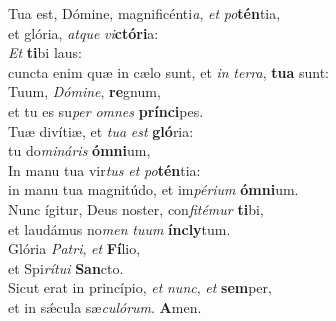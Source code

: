 \evenverse Tua est, Dómine, magnificénti\textit{a}, \textit{et} \textit{po}\textbf{tén}tia,~\*\\
\evenverse et glória, \textit{at}\textit{que} \textit{vi}\textbf{ctó}\textbf{ri}a:\\
\oddverse \textit{Et} \textbf{ti}bi laus:~\*\\
\oddverse cuncta enim quæ in cælo sunt, et \textit{in} \textit{ter}\textit{ra}, \textbf{tu}\textbf{a} sunt:\\
\evenverse Tuum, \textit{Dó}\textit{mi}\textit{ne}, \textbf{re}gnum,~\*\\
\evenverse et tu es su\textit{per} \textit{om}\textit{nes} \textbf{prín}\textbf{ci}pes.\\
\oddverse Tuæ divítiæ, et \textit{tu}\textit{a} \textit{est} \textbf{gló}ria:~\*\\
\oddverse tu do\textit{mi}\textit{ná}\textit{ris} \textbf{óm}\textbf{ni}um,\\
\evenverse In manu tua vir\textit{tus} \textit{et} \textit{po}\textbf{tén}tia:~\*\\
\evenverse in manu tua magnitúdo, et im\textit{pé}\textit{ri}\textit{um} \textbf{óm}\textbf{ni}um.\\
\oddverse Nunc ígitur, Deus noster, con\textit{fi}\textit{té}\textit{mur} \textbf{ti}bi,~\*\\
\oddverse et laudámus no\textit{men} \textit{tu}\textit{um} \textbf{ín}\textbf{cly}tum.\\
\evenverse Glória \textit{Pa}\textit{tri}, \textit{et} \textbf{Fí}lio,~\*\\
\evenverse et Spi\textit{rí}\textit{tu}\textit{i} \textbf{San}cto.\\
\oddverse Sicut erat in princípio, \textit{et} \textit{nunc}, \textit{et} \textbf{sem}per,~\*\\
\oddverse et in sǽcula sæ\textit{cu}\textit{ló}\textit{rum}. \textbf{A}men.\\
